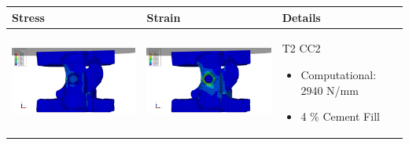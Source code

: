 \documentclass[11pt,a4paper]{article}
\begin{document}
\begin{landscape}
\begin{longtable}{|m{11cm}|m{11cm}|m{4cm}|}
   \\ \hline
Stress & Strain & Details \\ \hline
\includegraphics[width=10cm]{images/T2_CC2_intact_MM_cement_Anterior_ABAQUS_Stress.png}   & \includegraphics[width=10cm]{images/T2_CC2_intact_MM_cement_Anterior_ABAQUS_Strain.png}   & T2 CC2 \begin{itemize} \item  Computational:	2940 N/mm \item 4 \% Cement Fill \end{itemize} \\ \hline 

\end{longtable}
\end{landscape}
\end{document}
